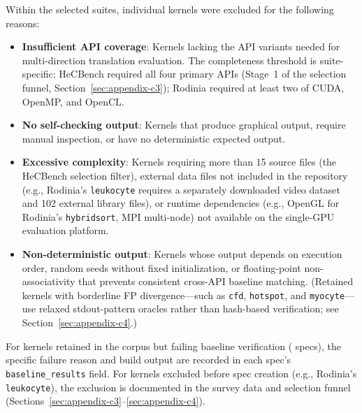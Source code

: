   Within the selected suites, individual kernels were excluded for the following
  reasons:
  \begin{itemize}
    \item \textbf{Insufficient API coverage}: Kernels lacking the API variants
      needed for multi-direction translation evaluation. The completeness
      threshold is suite-specific: HeCBench required all four primary APIs
      (Stage~1 of the selection funnel, Section~\ref{sec:appendix-c3}); Rodinia
      required at least two of CUDA, OpenMP, and OpenCL.
    \item \textbf{No self-checking output}: Kernels that produce graphical output,
      require manual inspection, or have no deterministic expected output.
    \item \textbf{Excessive complexity}: Kernels requiring more than 15 source
      files (the HeCBench selection filter), external data files not included in
      the repository (e.g., Rodinia's \texttt{leukocyte} requires a separately
      downloaded video dataset and 102 external library files), or runtime
      dependencies (e.g., OpenGL for Rodinia's \texttt{hybridsort}, MPI
      multi-node) not available on the single-GPU evaluation platform.
    \item \textbf{Non-deterministic output}: Kernels whose output depends on
      execution order, random seeds without fixed initialization, or
      floating-point non-associativity that prevents consistent cross-API
      baseline matching. (Retained kernels with borderline FP divergence---such as
      \texttt{cfd}, \texttt{hotspot}, and \texttt{myocyte}---use relaxed
      stdout-pattern oracles rather than hash-based verification; see
      Section~\ref{sec:appendix-c4}.)
  \end{itemize}

  For kernels retained in the corpus but failing baseline verification
  (\knownfail{} specs), the specific failure reason and build output are recorded
  in each spec's \texttt{baseline\_results} field. For kernels excluded before
  spec creation (e.g., Rodinia's \texttt{leukocyte}), the exclusion is
  documented in the survey data and selection funnel
  (Sections~\ref{sec:appendix-c3}--\ref{sec:appendix-c4}).



